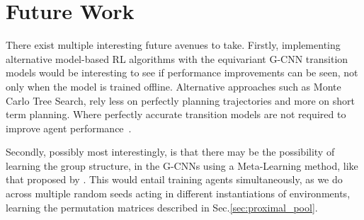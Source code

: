 \section{Future Work}
There exist multiple interesting future avenues to take. Firstly, implementing alternative model-based RL algorithms with the equivariant G-CNN transition models would be interesting to see if performance improvements can be seen, not only when the model is trained offline. Alternative approaches such as Monte Carlo Tree Search, rely less on perfectly planning trajectories and more on short term planning. Where perfectly accurate transition models are not required to improve agent performance~\cite{silver2016mastering}.

Secondly, possibly most interestingly, is that there may be the possibility of learning the group structure, in the G-CNNs using a Meta-Learning method, like that proposed by \cite{zhou2020meta}. This would entail training agents simultaneously, as we do across multiple random seeds acting in different instantiations of environments, learning the permutation matrices described in Sec.\ref{sec:proximal_pool}.

